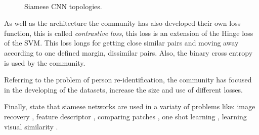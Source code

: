 \documentclass[12pt, a4paper, titlepage,twoside,openright]{article}
\begin{document}
\begin{figure}[H]
		
\centering

\\


\caption{Siamese CNN topologies.}
\label{siamese1}
\end{figure}


As well as the architecture the community has also developed their own loss function, this is called \textit{contrastive loss}, this loss is an extension of the Hinge loss of the SVM. This loss longs for getting close similar pairs and moving away according to one defined margin, dissimilar pairs. Also, the binary cross entropy is used by the community.


Referring to the problem of person re-identification, the community has focused in the developing of the datasets, increase the size and use of different losses. 






Finally, state that siamese networks are used in a variaty of problems like: image recovery \cite{siameseQuer}, feature descriptor \cite{siameDescri}, comparing patches \cite{patch1}, one shot learning \cite{siameseOne}, learning visual similarity \cite{siamesSImi}. 
\end{document}
